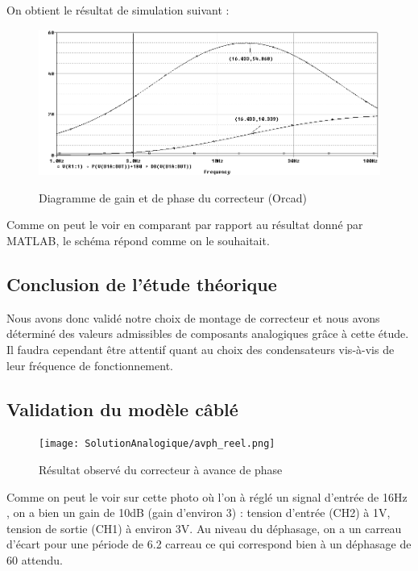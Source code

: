 \documentclass[11pt, french]{article} %
\begin{document}
On obtient le résultat de simulation suivant : 

\begin{figure}[!h]
    \centering
	\includegraphics[width = 15cm]{SolutionAnalogique/orcad_simu.png} 
	\label{avph_schm_simu_res}
	\caption{Diagramme de gain et de phase du correcteur (Orcad)}
\end{figure}


Comme on peut le voir en comparant par rapport au résultat donné par MATLAB, le schéma répond comme on le souhaitait. 

\vspace{0.5cm}
\subsection{Conclusion de l'étude théorique}

\noindent
Nous avons donc validé notre choix de montage de correcteur et nous avons déterminé des valeurs admissibles de composants analogiques grâce à cette étude. Il faudra cependant être attentif quant au choix des condensateurs vis-à-vis de leur fréquence de fonctionnement.  

\subsection{Validation du modèle câblé}

\vspace{0.5cm}

\begin{figure}[!h]
    \centering
	\texttt{[image: SolutionAnalogique/avph\_reel.png]} 
	\label{avph_reel}
	\caption{Résultat observé du correcteur à avance de phase}
\end{figure}

Comme on peut le voir sur cette photo où l'on à réglé un signal d'entrée de 16Hz , on a bien un gain de 10dB (gain d'environ 3) : tension d'entrée (CH2) à 1V, tension de sortie (CH1) à environ 3V. Au niveau du déphasage, on a un carreau d'écart pour une période de 6.2 carreau ce qui correspond bien à un déphasage de 60 attendu. 
\end{document}
